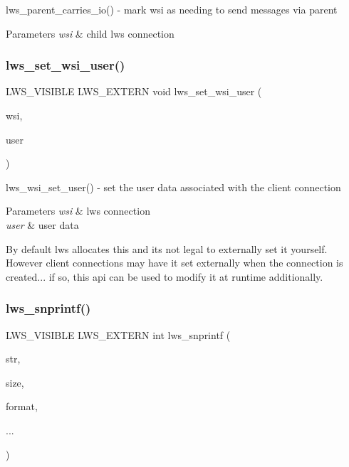 lws\+\_\+parent\+\_\+carries\+\_\+io() -\/ mark wsi as needing to send messages via parent


\begin{DoxyParams}{Parameters}
{\em wsi} & child lws connection \\
\hline
\end{DoxyParams}
\mbox{\label{group__misc_ga8d23abbe3fe1d53592b29c597a8245ba}} 
\subsubsection{\texorpdfstring{lws\+\_\+set\+\_\+wsi\+\_\+user()}{lws\_set\_wsi\_user()}}
{\footnotesize\ttfamily L\+W\+S\+\_\+\+V\+I\+S\+I\+B\+LE L\+W\+S\+\_\+\+E\+X\+T\+E\+RN void lws\+\_\+set\+\_\+wsi\+\_\+user (\begin{DoxyParamCaption}\item[{struct \hyperlink{structlws}{lws} $\ast$}]{wsi,  }\item[{void $\ast$}]{user }\end{DoxyParamCaption})}

lws\+\_\+wsi\+\_\+set\+\_\+user() -\/ set the user data associated with the client connection 
\begin{DoxyParams}{Parameters}
{\em wsi} & lws connection \\
\hline
{\em user} & user data\\
\hline
\end{DoxyParams}
By default lws allocates this and it\textquotesingle{}s not legal to externally set it yourself. However client connections may have it set externally when the connection is created... if so, this api can be used to modify it at runtime additionally. \mbox{\label{group__misc_ga2163492f17db959a36967adb73d823b4}} 
\subsubsection{\texorpdfstring{lws\+\_\+snprintf()}{lws\_snprintf()}}
{\footnotesize\ttfamily L\+W\+S\+\_\+\+V\+I\+S\+I\+B\+LE L\+W\+S\+\_\+\+E\+X\+T\+E\+RN int lws\+\_\+snprintf (\begin{DoxyParamCaption}\item[{char $\ast$}]{str,  }\item[{size\+\_\+t}]{size,  }\item[{const char $\ast$}]{format,  }\item[{}]{... }\end{DoxyParamCaption})}

